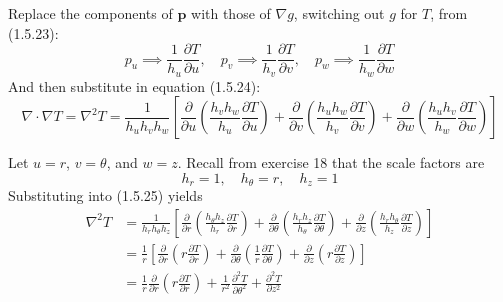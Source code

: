 \documentclass[a4paper]{article}
\begin{document}

Replace the components of \( \pmb{p} \) with those of \( \nabla g \), switching out \( g \) for \( T \), from (1.5.23):
\[
	p_{u} \implies \frac{1}{h_{u}}\frac{\partial T}{\partial u}, \quad p_{v} \implies \frac{1}{h_{v}}\frac{\partial T}{\partial v}, \quad p_{w} \implies \frac{1}{h_{w}}\frac{\partial T}{\partial w} 
\]
And then substitute in equation (1.5.24):
\[
	\nabla \cdot \nabla T = \nabla^{2}T = \frac{1}{h_{u}h_{v}h_{w}}\!\left[ \frac{\partial }{\partial u}\!\left( \frac{h_{v}h_{w}}{h_{u}}\frac{\partial T}{\partial u} \right) + \frac{\partial }{\partial v}\!\left( \frac{h_{u}h_{w}}{h_{v}}\frac{\partial T}{\partial v} \right) + \frac{\partial }{\partial w}\!\left( \frac{h_{u}h_{v}}{h_{w}}\frac{\partial T}{\partial w} \right) \right] 
\]


Let \( u = r \), \( v = \theta \), and \( w = z \). Recall from exercise 18 that the scale factors are
\[
	h_{r} = 1, \quad h_{\theta} = r, \quad h_{z} = 1 
\]
Substituting into (1.5.25) yields
\begin{align*}
	\nabla^{2}T & = \frac{1}{h_{r}h_{\theta}h_{z}}\!\left[ \frac{\partial }{\partial r}\!\left( \frac{h_{\theta}h_{z}}{h_{r}}\frac{\partial T}{\partial r} \right) + \frac{\partial }{\partial \theta}\!\left( \frac{h_{r}h_{z}}{h_{\theta}}\frac{\partial T}{\partial \theta} \right) + \frac{\partial }{\partial z}\!\left( \frac{h_{r}h_{\theta}}{h_{z}}\frac{\partial T}{\partial z} \right) \right] \\
	 & = \frac{1}{r}\!\left[ \frac{\partial }{\partial r}\!\left( r \frac{\partial T}{\partial r} \right) + \frac{\partial }{\partial \theta}\!\left( \frac{1}{r}\frac{\partial T}{\partial \theta} \right) + \frac{\partial }{\partial z}\!\left( r \frac{\partial T}{\partial z} \right) \right] \\
	 & = \frac{1}{r}\frac{\partial }{\partial r}\!\left( r \frac{\partial T}{\partial r} \right) + \frac{1}{r^{2}}\frac{\partial^2 T}{\partial \theta^2} + \frac{\partial^2 T}{\partial z^2}
\end{align*}
\end{document}
